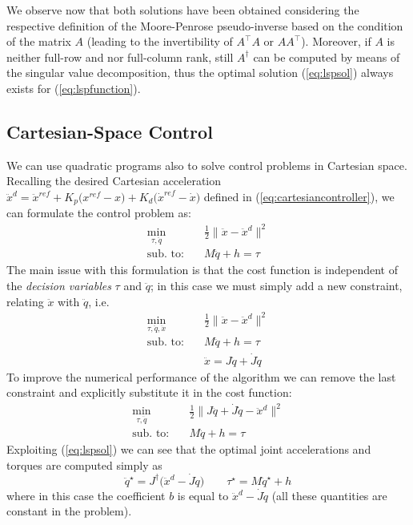 	We observe now that both solutions have been obtained considering the respective definition of the Moore-Penrose pseudo-inverse based on the condition of the matrix $A$ (leading to the invertibility of $A^\top A$ or $A A^\top$). 
	Moreover, if $A$ is neither full-row and nor full-column rank, still $A^\dagger$ can be computed by means of the singular value decomposition, thus the optimal solution (\ref{eq:lspsol}) always exists for (\ref{eq:lspfunction}).
	
\subsection{Cartesian-Space Control}
	We can use quadratic programs also to solve control problems in Cartesian space. 
	Recalling the desired Cartesian acceleration $\ddot x^d = \ddot x^{ref} + K_p\big(x^{ref}-x\big) + K_d\big(\dot x^{ref} - \dot x\big)$ defined in (\ref{eq:cartesiancontroller}), we can formulate the control problem as:
	\begin{align*}
		\min_{\tau, \ddot q} \quad & \frac12 \big\|\ddot x - \ddot x^d\|^2 \\
		\textrm{sub. to:} \quad & M\ddot q + h = \tau
	\end{align*}
	The main issue with this formulation is that the cost function is independent of the \textit{decision variables} $\tau$ and $\ddot q$; in this case we must simply add a new constraint, relating $\ddot x$ with $\ddot q$, i.e. 
	\begin{equation}
	\begin{aligned}
		\min_{\tau, \ddot q, \ddot x} \quad & \frac12 \big\|\ddot x - \ddot x^d\|^2 \\
		\textrm{sub. to:} \quad & M\ddot q + h = \tau \\
		& \ddot x = J\ddot q + \dot J \dot q
	\end{aligned}
	\end{equation}
	To improve the numerical performance of the algorithm we can remove the last constraint and explicitly substitute it in the cost function:
	\begin{equation} \label{eq:qpcartesian}
		\begin{aligned}
			\min_{\tau, \ddot q} \quad & \frac12 \big\| J\ddot q + \dot J\dot q - \ddot x^d\|^2 \\
			\textrm{sub. to:} \quad & M\ddot q + h = \tau
		\end{aligned}
	\end{equation}
	Exploiting (\ref{eq:lspsol}) we can see that the optimal joint accelerations and torques are computed simply as
	\[ \ddot q^\star = J^\dagger \big(\ddot x^d - \dot J\dot q\big) \qquad \tau^\star = M \ddot q^\star + h \tag{$\triangle$} \]
	where in this case the coefficient $b$ is equal to $\ddot x^d - \dot J \dot q$ (all these quantities are constant in the problem).
	
